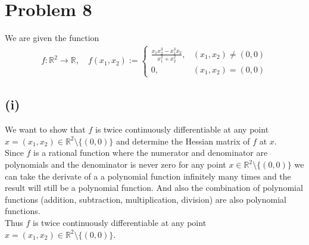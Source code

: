\documentclass{article}
\begin{document}
\section*{Problem 8}

We are given the function
\begin{align*}
   f : \mathbb{R}^2 \to \mathbb{R}, \quad f(x_1, x_2) :=
   \begin{cases}
      \frac{x_1 x_2^3 - x_1^3 x_2}{x_1^2 + x_2^2}, & (x_1, x_2) \neq (0, 0) \\
      0, & (x_1, x_2) = (0, 0)
   \end{cases}
\end{align*}

\subsection*{(i)}
We want to show that \(f\) is twice continuously differentiable at any point \(x = (x_1, x_2) \in \mathbb{R}^2 \setminus \{(0, 0)\}\) and determine the Hessian matrix of \(f\) at \(x\). \\
Since \(f\) is a rational function where the numerator and denominator are polynomials and the denominator is never zero for any point \(x \in \mathbb{R}^2 \setminus \{(0, 0)\}\)
we can take the derivate of a a polynomial function infinitely many times and the result will still be a polynomial function. And also the combination of polynomial functions (addition, subtraction, multiplication, division) are also polynomial functions. \\
Thus \(f\) is twice continuously differentiable at any point \(x = (x_1, x_2) \in \mathbb{R}^2 \setminus \{(0, 0)\}\). \\
\end{document}

